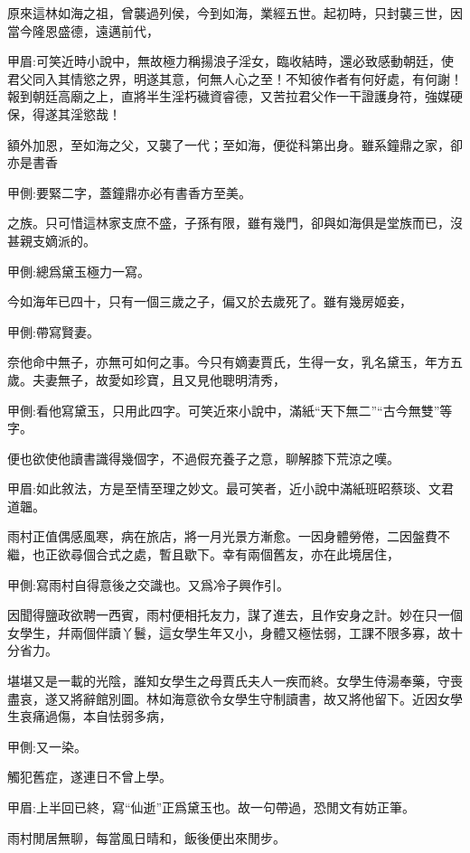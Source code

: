 \begin{parag}
    原來這林如海之祖，曾襲過列侯，今到如海，業經五世。起初時，只封襲三世，因當今隆恩盛德，遠邁前代，\begin{note}甲眉:可笑近時小說中，無故極力稱揚浪子淫女，臨收結時，還必致感動朝廷，使君父同入其情慾之界，明遂其意，何無人心之至！不知彼作者有何好處，有何謝！報到朝廷高廟之上，直將半生淫朽穢資睿德，又苦拉君父作一干證護身符，強媒硬保，得遂其淫慾哉！\end{note}額外加恩，至如海之父，又襲了一代；至如海，便從科第出身。雖系鐘鼎之家，卻亦是書香\begin{note}甲側:要緊二字，蓋鐘鼎亦必有書香方至美。\end{note}之族。只可惜這林家支庶不盛，子孫有限，雖有幾門，卻與如海俱是堂族而已，沒甚親支嫡派的。\begin{note}甲側:總爲黛玉極力一寫。\end{note}今如海年已四十，只有一個三歲之子，偏又於去歲死了。雖有幾房姬妾，\begin{note}甲側:帶寫賢妻。\end{note}奈他命中無子，亦無可如何之事。今只有嫡妻賈氏，生得一女，乳名黛玉，年方五歲。夫妻無子，故愛如珍寶，且又見他聰明清秀，\begin{note}甲側:看他寫黛玉，只用此四字。可笑近來小說中，滿紙“天下無二”“古今無雙”等字。\end{note}便也欲使他讀書識得幾個字，不過假充養子之意，聊解膝下荒涼之嘆。\begin{note}甲眉:如此敘法，方是至情至理之妙文。最可笑者，近小說中滿紙班昭蔡琰、文君道韞。\end{note}
\end{parag}


\begin{parag}
    雨村正值偶感風寒，病在旅店，將一月光景方漸愈。一因身體勞倦，二因盤費不繼，也正欲尋個合式之處，暫且歇下。幸有兩個舊友，亦在此境居住，\begin{note}甲側:寫雨村自得意後之交識也。又爲冷子興作引。\end{note}因聞得鹽政欲聘一西賓，雨村便相托友力，謀了進去，且作安身之計。妙在只一個女學生，幷兩個伴讀丫鬟，這女學生年又小，身體又極怯弱，工課不限多寡，故十分省力。
\end{parag}


\begin{parag}
    堪堪又是一載的光陰，誰知女學生之母賈氏夫人一疾而終。女學生侍湯奉藥，守喪盡哀，遂又將辭館別圖。林如海意欲令女學生守制讀書，故又將他留下。近因女學生哀痛過傷，本自怯弱多病，\begin{note}甲側:又一染。\end{note}觸犯舊症，遂連日不曾上學。\begin{note}甲眉:上半回已終，寫“仙逝”正爲黛玉也。故一句帶過，恐閒文有妨正筆。\end{note}雨村閒居無聊，每當風日晴和，飯後便出來閒步。
\end{parag}


